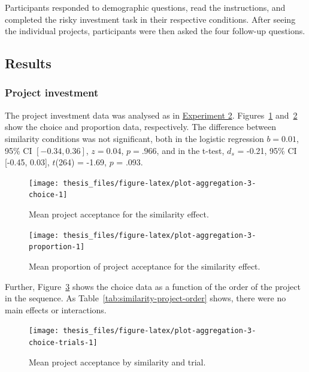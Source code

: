 \documentclass[a4paper, nobind, dvipsnames]{templates/ociamthesis}
\theoremstyle{definition}
\theoremstyle{definition}
\theoremstyle{definition}
\theoremstyle{definition}
\theoremstyle{remark}
\begin{document}
Participants responded to demographic questions, read the instructions, and
completed the risky investment task in their respective conditions. After seeing
the individual projects, participants were then asked the four follow-up
questions.

\subsection{Results}

\subsubsection{Project investment}

The project investment data was analysed as in
\protect\hyperlink{results-aggregation-2}{Experiment 2}.
Figures~\ref{fig:plot-aggregation-3-choice}
and~\ref{fig:plot-aggregation-3-proportion} show the choice and proportion
data, respectively. The difference between similarity conditions was not
significant, both in the logistic regression
\(b = 0.01\), 95\% CI \([-0.34, 0.36]\), \(z = 0.04\), \(p = .966\), and in the t-test,
\(d_s\) = -0.21, 95\% CI {[}-0.45, 0.03{]}, \(t\)(264) = -1.69, \(p\) = .093.



\begin{figure}
\texttt{[image: thesis\_files/figure-latex/plot-aggregation-3-choice-1]} \caption{Mean project acceptance for the similarity effect.}\label{fig:plot-aggregation-3-choice}
\end{figure}



\begin{figure}
\texttt{[image: thesis\_files/figure-latex/plot-aggregation-3-proportion-1]} \caption{Mean proportion of project acceptance for the similarity effect.}\label{fig:plot-aggregation-3-proportion}
\end{figure}

Further, Figure~\ref{fig:plot-aggregation-3-choice-trials} shows the choice
data as a function of the order of the project in the sequence. As
Table~\ref{tab:similarity-project-order} shows, there were no main effects or
interactions.



\begin{figure}
\texttt{[image: thesis\_files/figure-latex/plot-aggregation-3-choice-trials-1]} \caption{Mean project acceptance by similarity and trial.}\label{fig:plot-aggregation-3-choice-trials}
\end{figure}
\end{document}
